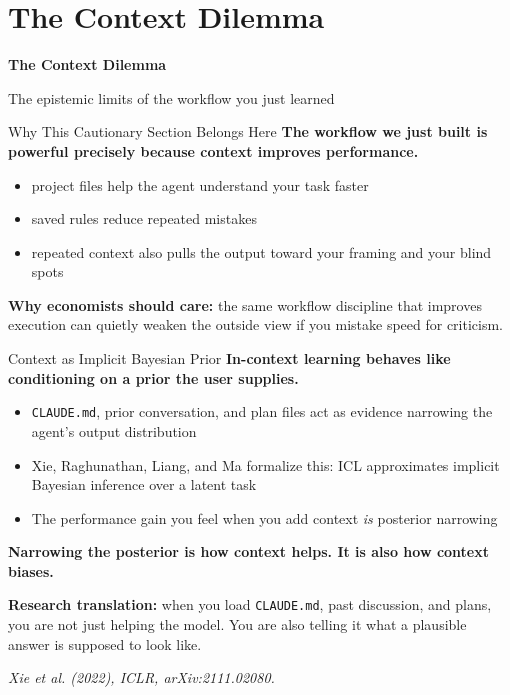 \documentclass[10pt,english,aspectratio=169]{beamer}
\newcommand{\sectiondivider}[2]{%
\begin{frame}[plain,noframenumbering]
\begin{center}
\vfill
{\Large\textbf{#1}\par}
\vspace{0.35cm}
{\normalsize #2\par}
\vfill
\end{center}
\end{frame}
}
\begin{document}
\section{The Context Dilemma}

\sectiondivider{The Context Dilemma}{The epistemic limits of the workflow you just learned}

\begin{frame}{Why This Cautionary Section Belongs Here}
\textbf{The workflow we just built is powerful precisely because context improves performance.}

\vspace{0.25cm}

\begin{itemize}
    \item project files help the agent understand your task faster
    \item saved rules reduce repeated mistakes
    \item repeated context also pulls the output toward your framing and your blind spots
\end{itemize}

\vspace{0.3cm}

\textbf{Why economists should care:} the same workflow discipline that improves execution can quietly weaken the outside view if you mistake speed for criticism.
\end{frame}

\begin{frame}{Context as Implicit Bayesian Prior}
\textbf{In-context learning behaves like conditioning on a prior the user supplies.}

\vspace{0.25cm}

\begin{itemize}
    \item \texttt{CLAUDE.md}, prior conversation, and plan files act as evidence narrowing the agent's output distribution
    \item Xie, Raghunathan, Liang, and Ma formalize this: ICL approximates implicit Bayesian inference over a latent task
    \item The performance gain you feel when you add context \textit{is} posterior narrowing
\end{itemize}

\vspace{0.25cm}

\textbf{Narrowing the posterior is how context helps. It is also how context biases.}

\vspace{0.15cm}
\textbf{Research translation:} when you load \texttt{CLAUDE.md}, past discussion, and plans, you are not just helping the model. You are also telling it what a plausible answer is supposed to look like.

\vspace{0.15cm}
{\scriptsize \textit{Xie et al. (2022), ICLR, arXiv:2111.02080.}}
\end{frame}
\end{document}
